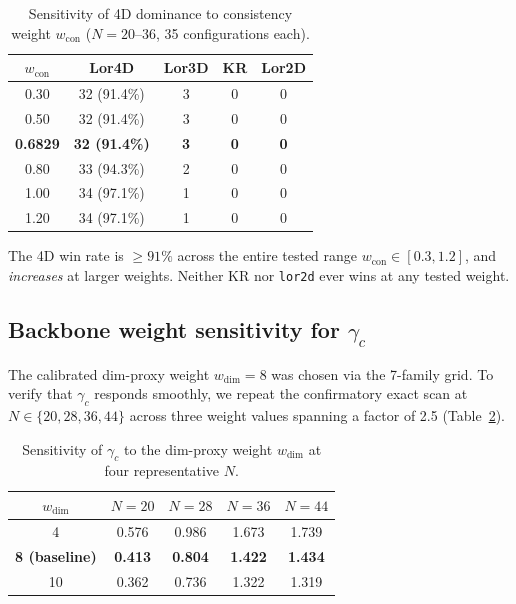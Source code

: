 \documentclass[12pt,a4paper]{article}
\begin{document}
\begin{table}[h]
\centering
\caption{Sensitivity of 4D dominance to consistency weight $w_{\text{con}}$
($N = 20$--$36$, 35 configurations each).}
\label{tab:wcon}
\begin{tabular}{ccccc}
\toprule
$w_{\text{con}}$ & \textbf{Lor4D} & \textbf{Lor3D} & \textbf{KR} &
\textbf{Lor2D} \\
\midrule
0.30 & 32 (91.4\%) & 3 & 0 & 0 \\
0.50 & 32 (91.4\%) & 3 & 0 & 0 \\
\textbf{0.6829} & \textbf{32 (91.4\%)} & \textbf{3} & \textbf{0} & \textbf{0} \\
0.80 & 33 (94.3\%) & 2 & 0 & 0 \\
1.00 & 34 (97.1\%) & 1 & 0 & 0 \\
1.20 & 34 (97.1\%) & 1 & 0 & 0 \\
\bottomrule
\end{tabular}
\end{table}

The 4D win rate is $\geq 91\%$ across the entire tested range
$w_{\text{con}} \in [0.3, 1.2]$, and \emph{increases} at larger weights.
Neither KR nor \texttt{lor2d} ever wins at any tested weight.

\subsection{Backbone weight sensitivity for \texorpdfstring{$\gamma_c$}{gamma\_c}}
\label{sec:wdim}

The calibrated dim-proxy weight $w_{\text{dim}} = 8$ was chosen via the
7-family grid. To verify that $\gamma_c$ responds smoothly, we repeat the
confirmatory exact scan at $N \in \{20, 28, 36, 44\}$ across three weight
values spanning a factor of 2.5 (Table~\ref{tab:wdim}).

\begin{table}[h]
\centering
\caption{Sensitivity of $\gamma_c$ to the dim-proxy weight $w_{\text{dim}}$
at four representative $N$.}
\label{tab:wdim}
\begin{tabular}{ccccc}
\toprule
$w_{\text{dim}}$ & $N = 20$ & $N = 28$ & $N = 36$ & $N = 44$ \\
\midrule
4  & 0.576 & 0.986 & 1.673 & 1.739 \\
\textbf{8 (baseline)} & \textbf{0.413} & \textbf{0.804} & \textbf{1.422} & \textbf{1.434} \\
10 & 0.362 & 0.736 & 1.322 & 1.319 \\
\bottomrule
\end{tabular}
\end{table}
\end{document}
